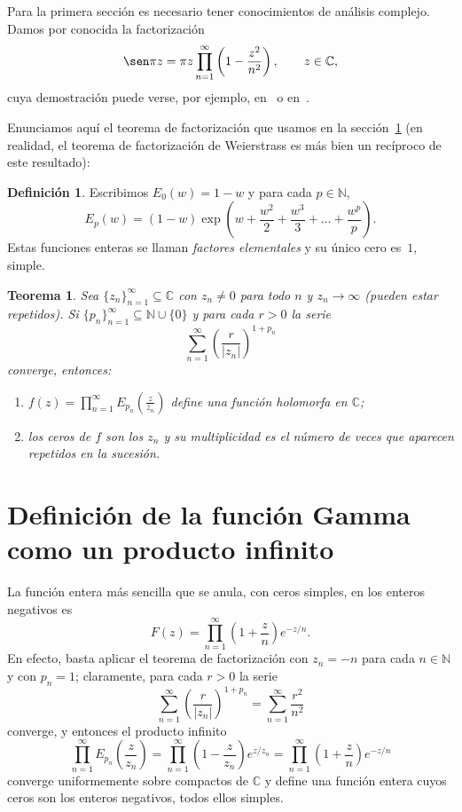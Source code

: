 \documentclass[11pt]{book}
\theoremstyle{plain} %
\newtheorem{teorema}{Teorema}[chapter]
\theoremstyle{definition} %
\newtheorem*{defin}{Definición} %
\newcommand\N{\mathbb{N}}
\newcommand\C{\mathbb{C}}
\begin{document}
Para la primera sección es necesario tener conocimientos de análisis complejo. 
Damos por conocida la factorización
\begin{equation}
\label{factor-seno}
   \sen \pi z = \pi z \prod_{n=1}^\infty \left(1 - \frac{z^2}{n^2} \right),
   \qquad z \in \C,
\end{equation}
cuya demostración puede verse, por ejemplo, en~\cite[pág.~518]{BC} o 
en~\cite[pág.~211--212]{W}.

Enunciamos aquí el teorema de factorización que 
usamos en la sección~\ref{Gamma-producto} (en realidad, el teorema de 
factorización de Weierstrass es más bien un recíproco de este resultado):
\begin{defin}
Escribimos $E_0(w) = 1 - w$ y para cada $p \in \N$,
\[
   E_p(w) 
   = (1-w) \exp\left(w + \frac{w^2}{2} + \frac{w^3}{3} + \dots + \frac{w^p}{p}\right).
\]
Estas funciones enteras se llaman \emph{factores elementales} y su único cero 
es~$1$, simple.
\end{defin}

\begin{teorema}
Sea $\{z_n\}_{n=1}^\infty \subseteq \C$ con $z_n \not= 0$ para todo $n$ y $z_n 
\to \infty$ (pueden estar repetidos). Si $\{p_n\}_{n=1}^\infty \subseteq \N \cup 
\{0\}$ y para cada $r > 0$ la serie
\[
   \sum_{n=1}^\infty \left(\frac{r}{|z_n|}\right)^{1+p_n}
\]
converge, entonces:
\begin{enumerate}
\item[a)] $f(z) = \prod\limits_{n=1}^\infty E_{p_n}(\frac{z}{z_n})$ define una 
función holomorfa en $\C$;
\item[b)] los ceros de $f$ son los $z_n$ y su multiplicidad es el número de veces 
que aparecen repetidos en la sucesión.
\end{enumerate}
\end{teorema}

\section{Definición de la función Gamma como un producto infinito}
\label{Gamma-producto}

La función entera más sencilla que se anula, con ceros 
simples, en los enteros negativos es
\begin{equation}
\label{defF}
   F(z) = \prod_{n=1}^\infty \left(1 + \frac{z}{n}\right) e^{-z/n}.
\end{equation}
En efecto, basta aplicar el teorema de 
factorización con $z_n = -n$ para cada $n \in \N$ 
y con $p_n = 1$; claramente, para cada $r > 0$ la serie
\[
   \sum_{n=1}^\infty \left( \frac{r}{|z_n|} \right)^{1+p_n}
   = \sum_{n=1}^\infty \frac{r^2}{n^2}
\]
converge, y entonces el producto infinito
\[
   \prod_{n=1}^\infty E_{p_n}\left(\frac{z}{z_n}\right)
   = \prod_{n=1}^\infty \left(1 - \frac{z}{z_n}\right) e^{z/z_n}
   = \prod_{n=1}^\infty \left(1 + \frac{z}{n}\right) e^{-z/n}
\]
converge uniformemente sobre 
compactos de $\C$ y define una 
función entera cuyos ceros son los enteros negativos, todos ellos simples.
\end{document}
